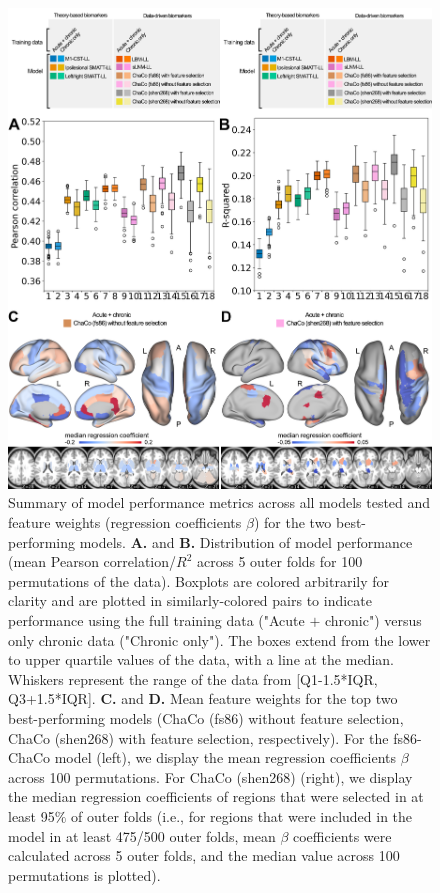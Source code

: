 \documentclass[10pt]{article}
\def\Plus{\texttt{+}}
\begin{document}
\begin{figure}[htp]
\centering
\includegraphics[width=1\linewidth]{figures/Analysis1.png}
\caption{Summary of model performance metrics across all models tested and feature weights (regression coefficients $\beta$) for the two best-performing models.  \textbf{A.} and \textbf{B.} Distribution of model performance (mean Pearson correlation/$R^2$ across 5 outer folds for 100 permutations of the data).  Boxplots are colored arbitrarily for clarity and are plotted in similarly-colored pairs to indicate performance using the full training data ("Acute $\Plus$  chronic") versus only chronic data ("Chronic only"). The boxes extend from the lower to upper quartile values of the data, with a line at the median. Whiskers represent the range of the data from [Q1-1.5*IQR, Q3+1.5*IQR].
\textbf{C.} and \textbf{D.} Mean feature weights for the top two best-performing models (ChaCo (fs86) without feature selection, ChaCo (shen268) with feature selection, respectively). For the fs86-ChaCo model (left), we display the mean regression coefficients  $\beta$ across 100 permutations. For ChaCo (shen268) (right), we display the median regression coefficients of regions that were selected in at least 95$\%$ of outer folds (i.e., for regions that were included in the model in at least 475/500 outer folds, mean $\beta$ coefficients were calculated across 5 outer folds, and the median value across 100 permutations is plotted). }
\label{analysis1}
\end{figure}
\end{document}

